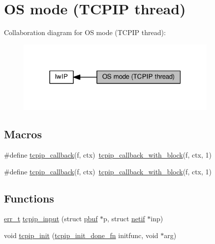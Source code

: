 \hypertarget{group__lwip__os}{}\section{OS mode (T\+C\+P\+IP thread)}
\label{group__lwip__os}
Collaboration diagram for OS mode (T\+C\+P\+IP thread)\+:
\nopagebreak
\begin{figure}[H]
\begin{center}
\leavevmode
\includegraphics[width=279pt]{group__lwip__os}
\end{center}
\end{figure}
\subsection*{Macros}
\begin{DoxyCompactItemize}
\item 
\#define \hyperlink{group__lwip__os_ga7eb868a1215472ec38f3f2a04d442b9f}{tcpip\+\_\+callback}(f,  ctx)~\hyperlink{openmote-cc2538_2lwip_2src_2include_2lwip_2tcpip_8h_ab1d3ef23817d7703fa75ed67bd45ea1d}{tcpip\+\_\+callback\+\_\+with\+\_\+block}(f, ctx, 1)
\item 
\#define \hyperlink{group__lwip__os_ga7eb868a1215472ec38f3f2a04d442b9f}{tcpip\+\_\+callback}(f,  ctx)~\hyperlink{openmote-cc2538_2lwip_2src_2include_2lwip_2tcpip_8h_ab1d3ef23817d7703fa75ed67bd45ea1d}{tcpip\+\_\+callback\+\_\+with\+\_\+block}(f, ctx, 1)
\end{DoxyCompactItemize}
\subsection*{Functions}
\begin{DoxyCompactItemize}
\item 
\hyperlink{group__infrastructure__errors_gaf02d9da80fd66b4f986d2c53d7231ddb}{err\+\_\+t} \hyperlink{group__lwip__os_gae510f195171bed8499ae94e264a92717}{tcpip\+\_\+input} (struct \hyperlink{structpbuf}{pbuf} $\ast$p, struct \hyperlink{structnetif}{netif} $\ast$inp)
\item 
void \hyperlink{group__lwip__os_ga1f3a88b8df6ba3b9ed1c00e0a305e3db}{tcpip\+\_\+init} (\hyperlink{openmote-cc2538_2lwip_2src_2include_2lwip_2tcpip_8h_a5fe07216c441e27c3028bcac60fa0992}{tcpip\+\_\+init\+\_\+done\+\_\+fn} initfunc, void $\ast$arg)
\end{DoxyCompactItemize}


